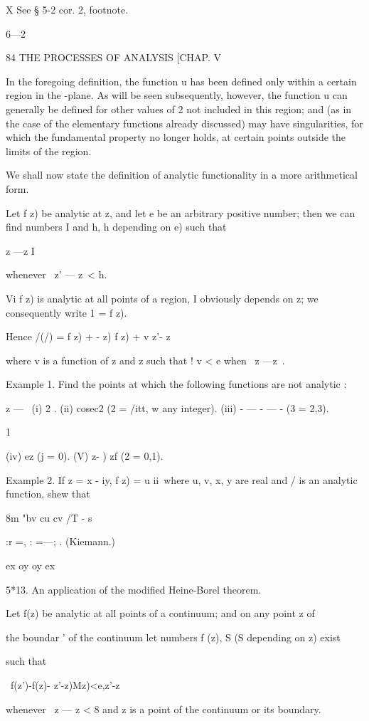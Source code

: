 X See § 5-2 cor. 2, footnote.

6—2

84 THE PROCESSES OF ANALYSIS [CHAP. V

In the foregoing definition, the function u has been defined only
within a certain region in the -plane. As will be seen subsequently,
however, the function u can generally be defined for other values of 2
not included in this region; and (as in the case of the elementary
functions already discussed) may have singularities, for which the
fundamental property no longer holds, at certain points outside the
limits of the region.

We shall now state the definition of analytic functionality in a more
arithmetical form.

Let f z) be analytic at z, and let e be an arbitrary positive number;
then we can find numbers I and h, h depending on e) such that

z —z I

whenever \ z' — z\ < h.

Vi f z) is analytic at all points of a region, I obviously depends on
z; we consequently write 1 = f z).

Hence /(/) = f z) + - z) f z) + v z'- z\

where v is a function of z and z such that ! v < e when \ z —z\ < t>.

Example 1. Find the points at which the following functions are not
analytic :

z — \ (i) 2 . (ii) cosec2 (2 = /itt, w any integer). (iii) - — - — -
(3 = 2,3).

1

(iv) ez (j = 0). (V) z- ) zf (2 = 0,1).

Example 2. If z = x - iy, f z) = u ii\ where u, v, x, y are real and /
is an analytic function, shew that

8m "bv cu cv /T - s

 :r =, : =—; . (Kiemann.)

ex oy oy ex

5*13. An application of the modified Heine-Borel theorem.

Let f(z) be analytic at all points of a continuum; and on any point z
of

the boundar ' of the continuum let numbers f (z), S (S depending on z)
exist

such that

\ f(z')-f(z)- z'-z)Mz)<e,z'-z\

whenever \ z — z < 8 and z is a point of the continuum or its
boundary.


